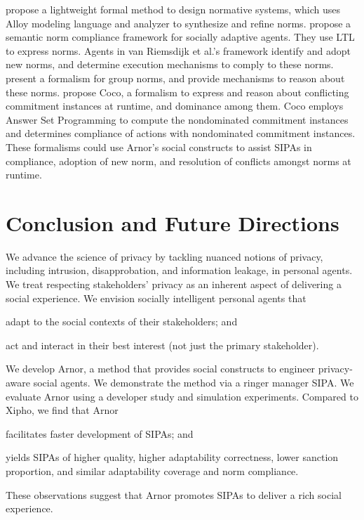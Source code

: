 \documentclass[11pt,          %
               phd,           %
               onehalfspacing %
               ]{ncsuthesis}
\makeatletter
\newcommand{\etal}{{et al.\@\xspace}}
\newcommand{\frameworkA}{Arnor\xspace}
\makeatother
\begin{document}
\citet{Hao-FSE16-Norms+formal} propose a lightweight formal
method to design normative systems, which uses Alloy modeling language
and analyzer to synthesize and refine norms. 
 propose a semantic norm
compliance framework for socially adaptive agents. They use LTL to
express norms. Agents in van Riemsdijk {\etal}'s framework identify and
adopt new norms, and determine execution mechanisms to comply to these
norms. \citet{Aldewereld-TAAS16-GroupNorms} present a
formalism for group norms, and provide mechanisms to reason about these
norms. \citet{Ajmeri-IJCAI16-Coco} propose Coco, a
formalism to express and reason about conflicting commitment instances
at runtime, and dominance among them. Coco employs Answer Set
Programming to compute the nondominated commitment instances and
determines compliance of actions with nondominated commitment instances.
These formalisms could use \frameworkA's social constructs to assist
SIPAs in compliance, adoption of new norm, and resolution of conflicts
amongst norms at runtime.

\section{Conclusion and Future Directions}
\label{sec:arnor-discussion}

We advance the science of privacy by tackling nuanced notions of
privacy, including intrusion, disapprobation, and information leakage,
in personal agents. We treat respecting stakeholders' privacy as an
inherent aspect of delivering a social experience. We envision socially
intelligent personal agents that
\begin{enumerate*}[label=(\arabic*)]
\item adapt to the social contexts of their stakeholders; and
\item act and interact in their best interest (not just the primary stakeholder).  
\end{enumerate*}

We develop \frameworkA, a method that provides social constructs to
engineer privacy-aware social agents. We demonstrate the method via a
ringer manager SIPA. We evaluate \frameworkA using a developer study and
simulation experiments. Compared to Xipho, we find that \frameworkA
\begin{enumerate*}[label=(\arabic*)]
\item facilitates faster development of SIPAs; and
\item yields SIPAs of higher quality, higher adaptability correctness, 
lower sanction proportion, and similar adaptability coverage and norm compliance.
\end{enumerate*}
These observations suggest that \frameworkA promotes SIPAs to deliver a rich 
social experience.
\end{document}
